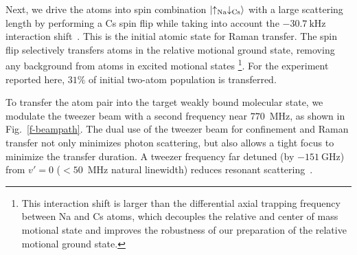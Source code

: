 \documentclass[aps,prl,twocolumn,10pt,superscriptaddress]{revtex4-1}
\newcommand{\Na}{\mathrm{Na}}
\newcommand{\Cs}{\mathrm{Cs}}
\newcommand{\todo}[1]{}
\newcounter{TRC}
\newcommand{\TR}[1]{\textcolor{violet}{[[\stepcounter{TRC} TR\arabic{TRC}: #1]]}}
\begin{document}
Next, we drive the atoms into spin combination $\ket{\uparrow_{\Na} \downarrow_{\Cs}}$ with a large scattering length
by performing a Cs spin flip while taking into account
the $-30.7~\mathrm{kHz}$ interaction shift~\cite{Hood2019}.
This is the initial atomic state for Raman transfer.
The spin flip selectively transfers atoms in the relative motional ground state,
removing any background from atoms in excited motional states
\footnote{This interaction shift is larger than the differential axial trapping frequency
  between Na and Cs atoms, which decouples the relative and center of mass motional state
  and improves the robustness of our preparation of the relative motional ground state.}.
For the experiment reported here,
$31\mathrm{\%}$ of initial two-atom population is transferred.

To transfer the atom pair into the target weakly bound molecular state,
we modulate the tweezer beam with a second frequency near $770$~MHz, as shown in Fig.~\ref{f-beampath}.
The dual use of the tweezer beam for confinement and Raman transfer not only minimizes photon scattering,
but also allows a tight focus to minimize the transfer duration. A tweezer frequency far detuned (by $-151~\mathrm{GHz}$) from $v' = 0 $ ($<50$~MHz natural linewidth) reduces resonant scattering~\cite{Liu2019}.
\end{document}
